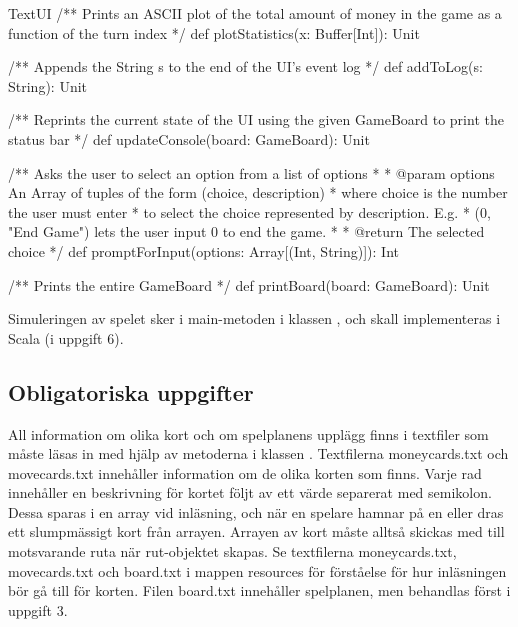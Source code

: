 \begin{ScalaSpec}{TextUI}
  /** Prints an ASCII plot of the total amount
      of money in the game as a function of the turn index */
  def plotStatistics(x: Buffer[Int]): Unit

  /** Appends the String s to the end of the UI's event log */
  def addToLog(s: String): Unit

  /** Reprints the current state of the UI using the given
      GameBoard to print the status bar */
  def updateConsole(board: GameBoard): Unit

  /** Asks the user to select an option from a list of options
   *
   * @param options An Array of tuples of the form (choice, description)
   *                where choice is the number the user must enter
   *                to select the choice represented by description. E.g.
   *                (0, "End Game") lets the user input 0 to end the game.
   *
   * @return The selected choice
   */
  def promptForInput(options: Array[(Int, String)]): Int

  /** Prints the entire GameBoard */
  def printBoard(board: GameBoard): Unit
\end{ScalaSpec}

Simuleringen av spelet sker i main-metoden i klassen , och skall implementeras i Scala (i uppgift 6).


\subsection{Obligatoriska uppgifter}

\Task All information om olika kort och om spelplanens upplägg finns i textfiler som måste läsas in med hjälp av metoderna i klassen .
Textfilerna moneycards.txt och movecards.txt innehåller information om de olika korten som finns.
Varje rad innehåller en beskrivning för kortet följt av ett värde separerat med semikolon. Dessa sparas i en array vid inläsning, och när en spelare hamnar på en  eller  dras ett slumpmässigt kort från arrayen.
Arrayen av kort måste alltså skickas med till motsvarande ruta när rut-objektet skapas.
Se textfilerna moneycards.txt, movecards.txt och board.txt i mappen resources för förståelse för hur inläsningen bör gå till för korten.
Filen board.txt innehåller spelplanen, men behandlas först i uppgift 3.



